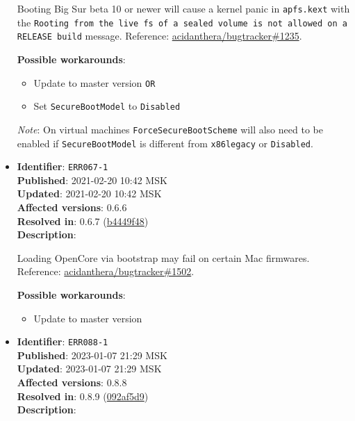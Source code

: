 \documentclass[]{article}
\providecommand{\tightlist}{%
  \setlength{\itemsep}{0pt}\setlength{\parskip}{0pt}}
\begin{document}
\begin{itemize}
  Booting Big Sur beta 10 or newer will cause a kernel panic in \texttt{apfs.kext} with the
  \texttt{Rooting from the live fs of a sealed volume is not allowed on a RELEASE build}
  message. Reference:
  \href{https://github.com/acidanthera/bugtracker/issues/1235}{acidanthera/bugtracker\#1235}.

  \textbf{Possible workarounds}:
  \begin{itemize}
    \tightlist

    \item Update to master version \texttt{OR}
    \item Set \texttt{SecureBootModel} to \texttt{Disabled}

  \end{itemize}

  \emph{Note}: On virtual machines \texttt{ForceSecureBootScheme} will also need
  to be enabled if \texttt{SecureBootModel} is different from \texttt{x86legacy}
  or \texttt{Disabled}.

\item
  \textbf{Identifier}: \texttt{ERR067-1} \\
  \textbf{Published}: 2021-02-20 10:42 MSK \\
  \textbf{Updated}: 2021-02-20 10:42 MSK \\
  \textbf{Affected versions}: 0.6.6 \\
  \textbf{Resolved in}: 0.6.7 (\href{https://github.com/acidanthera/OpenCorePkg/commit/b4449f48dd01703b5766352b6f29717415aff08b}{b4449f48}) \\
  \textbf{Description}:

  Loading OpenCore via bootstrap may fail on certain Mac firmwares. Reference:
  \href{https://github.com/acidanthera/bugtracker/issues/1502}{acidanthera/bugtracker\#1502}.

  \textbf{Possible workarounds}:
  \begin{itemize}
    \tightlist

    \item Update to master version

  \end{itemize}

\item
  \textbf{Identifier}: \texttt{ERR088-1} \\
  \textbf{Published}: 2023-01-07 21:29 MSK \\
  \textbf{Updated}: 2023-01-07 21:29 MSK \\
  \textbf{Affected versions}: 0.8.8 \\
  \textbf{Resolved in}: 0.8.9 (\href{https://github.com/acidanthera/OpenCorePkg/commit/092af5d99c764cbe06372dfed3fa03af719550cc}{092af5d9}) \\
  \textbf{Description}:


\end{itemize}
\end{document}
